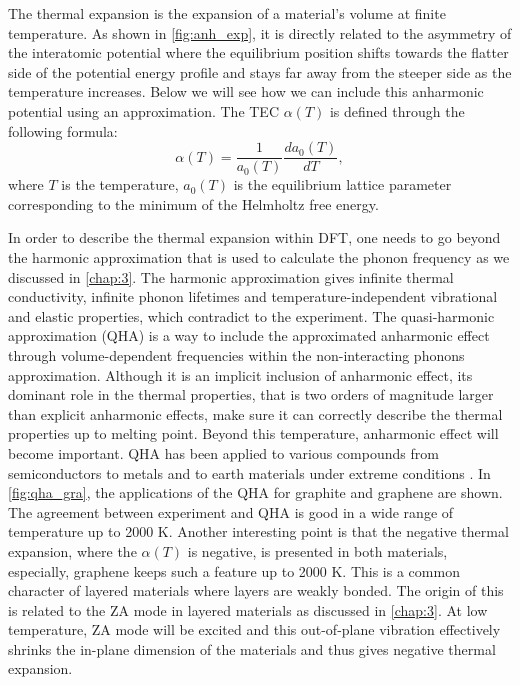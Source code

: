 The thermal expansion is the expansion of a material's volume at finite temperature. As shown in \autoref{fig:anh_exp}, it is directly related to the asymmetry of the interatomic potential where the equilibrium position shifts towards the flatter side of the potential energy profile and stays far away from the steeper side as the temperature increases. Below we will see how we can include this anharmonic potential using an approximation. The TEC $\alpha(T)$ is defined through the following formula: 
\begin{equation}
\alpha(T)=\frac{1}{a_0(T)}\frac{da_0(T)}{dT},
\end{equation}
where $T$ is the temperature, $a_0(T)$ is the equilibrium lattice parameter corresponding to the minimum of the Helmholtz free energy.

In order to describe the thermal expansion within DFT, one needs to go beyond the harmonic approximation that is used to calculate the phonon frequency as we discussed in \autoref{chap:3}. The harmonic approximation gives infinite thermal conductivity, infinite phonon lifetimes and temperature-independent vibrational and elastic properties, which contradict to the experiment. The quasi-harmonic approximation (QHA) \cite{QHA1,QHA2,QHA3,Baroni39} is a way to include the approximated anharmonic effect through volume-dependent frequencies within the non-interacting phonons approximation. Although it is an implicit inclusion of anharmonic effect, its dominant role in the thermal properties, that is two orders of magnitude larger than explicit anharmonic effects, make sure it can correctly describe the thermal properties up to melting point. Beyond this temperature, anharmonic effect will become important. QHA has been applied to various compounds from semiconductors to metals and to earth materials under extreme conditions\cite{QHA1,Grabowski2009,Karki2000} . In \autoref{fig:qha_gra}, the applications of the QHA for graphite and graphene are shown. The agreement between experiment and QHA is good in a wide range of temperature up to 2000 K. Another interesting point is that the negative thermal expansion, where the $\alpha(T)$ is negative, is presented in both materials, especially, graphene keeps such a feature up to 2000 K. This is a common character of layered materials where layers are weakly bonded. The origin of this is related to the ZA mode in layered materials as discussed in \autoref{chap:3}. At low temperature, ZA mode will be excited and this out-of-plane vibration effectively shrinks the in-plane dimension of the materials and thus gives negative thermal expansion.

